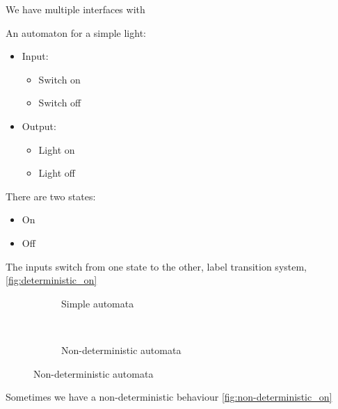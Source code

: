
We have multiple interfaces with

An automaton for a simple light:
\begin{itemize}
  \item Input:
  \begin{itemize}
    \item Switch on
    \item Switch off
  \end{itemize}
  \item Output:
  \begin{itemize}
    \item Light on
    \item Light off
  \end{itemize}
\end{itemize}

There are two states:
\begin{itemize}
  \item On
  \item Off
\end{itemize}

The inputs switch from one state to the other, label transition system, 
\autoref{fig:deterministic_on}

\begin{figure}
  \centering
  \begin{subfigure}[b]{.45\textwidth}
    \centering

    \caption{Simple automata \label{fig:deterministic_on}}
  \end{subfigure}
  ~
  \begin{subfigure}[b]{.45\textwidth}
    \centering
    
    \caption{Non-deterministic automata \label{fig:non-deterministic_on}}
  \end{subfigure}
\end{figure}
Sometimes we have a non-deterministic behaviour \autoref{fig:non-deterministic_on}

